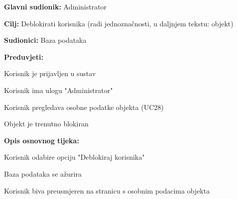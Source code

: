 					\noindent {}
					\begin{packed_item}
	
						\item \textbf{Glavni sudionik: }Administrator
						\item  \textbf{Cilj:} Deblokirati korisnika (radi jednoznačnosti, u daljnjem tekstu: objekt)
						\item  \textbf{Sudionici:} Baza podataka
						\item  \textbf{Preduvjeti:}
						\item[] \begin{packed_enum}
							\item Korisnik je prijavljen u sustav
							\item Korisnik ima ulogu "Administrator"
							\item Korisnik pregledava osobne podatke objekta (UC28)
							\item Objekt je trenutno blokiran
						\end{packed_enum}
						\item  \textbf{Opis osnovnog tijeka:}
						
						\item[] \begin{packed_enum}
	
							\item Korisnik odabire opciju "Deblokiraj korisnika"
							\item Baza podataka se ažurira
							\item Korisnik biva preusmjeren na stranicu s osobnim podacima objekta
						\end{packed_enum}
						
					\end{packed_item}
					
